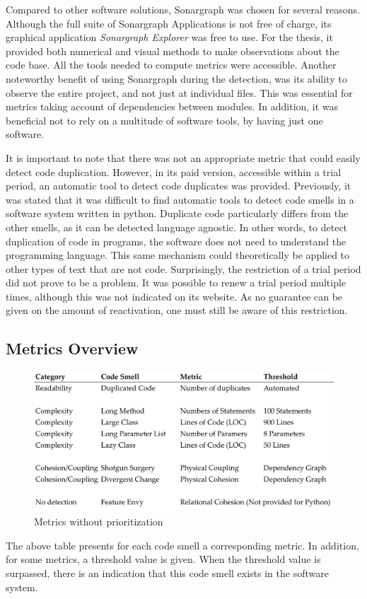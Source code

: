 Compared to other software solutions, Sonargraph was chosen for several reasons. Although the full suite of Sonargraph Applications is not free of charge, its graphical application \emph{Sonargraph Explorer} was free to use. For the thesis, it provided both numerical and visual methods to make observations about the code base. All the tools needed to compute metrics were accessible. Another noteworthy benefit of using Sonargraph during the detection, was its ability to observe the entire project,  and not just at individual files. This was essential for metrics taking account of dependencies between modules. In addition, it was beneficial not to rely on a multitude of software tools, by having just one software.

It is important to note that there was not an appropriate metric that could easily detect code duplication. However, in its paid version, accessible within a trial period, an automatic tool to detect code duplicates was provided.  Previously, it was stated that it was difficult to find automatic tools to detect code smells in a software system written in python. Duplicate code particularly differs from the other smells, as it can be detected language agnostic. In other words, to detect duplication of code in programs, the software does not need to understand the programming language. This same mechanism could theoretically be applied to other types of text that are not code. Surprisingly, the restriction of a trial period did not prove to be a problem. It was possible to renew a trial period multiple times, although this was not indicated on its website. As no guarantee can be given on the amount of reactivation, one must still be aware of this restriction. 

\subsection{Metrics Overview}

\begin{figure}[htp]
    \centering
    \includegraphics[width=\textwidth]{./assets/smell_overview}
    \caption{Metrics without prioritization}
\end{figure}
The above table presents for each code smell a corresponding metric. In addition, for some metrics, a threshold value is given. When the threshold value is surpassed, there is an indication that this code smell exists in the software system.

